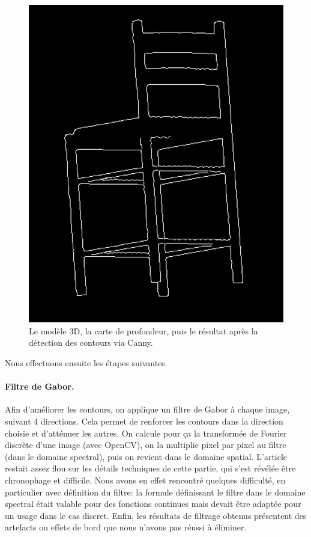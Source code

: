 \documentclass[12pt, a4paper, oneside]{article}
\begin{document}
\begin{figure}
\begin{center}
        \includegraphics[scale=0.41]{images/chaise-cany.png}
        \caption{Le modèle 3D, la carte de profondeur, puis le résultat après la détection des contours via Canny.\label{img:generer-vues}}
    \end{center}
\end{figure}

Nous effectuons ensuite les étapes suivantes.
\paragraph{Filtre de Gabor.}
Afin d'améliorer les contours, on applique un filtre de Gabor à chaque image, suivant 4 directions.
Cela permet de renforcer les contours dans la direction choisie et d'atténuer les autres.
On calcule pour ça la transformée de Fourier discrète d'une image (avec OpenCV), on la multiplie pixel par pixel au filtre (dans le domaine spectral), puis on revient dans le domaine spatial.
L'article restait assez flou sur les détails techniques de cette partie, qui s'est révélée être chronophage et difficile.
Nous avons en effet rencontré quelques difficulté, en particulier avec définition du filtre: la formule définissant le filtre dans le domaine spectral était valable pour des fonctions continues mais devait être adaptée pour un usage dans le cas discret.
Enfin, les résultats de filtrage obtenus présentent des artefacts ou effets de bord que nous n'avons pas réussi à éliminer.
\end{document}
